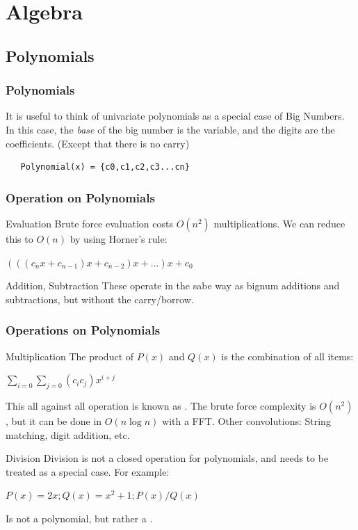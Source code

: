 \documentclass{beamer}
\begin{document}
\section{Algebra}
\subsection{Polynomials}

\begin{frame}
  \frametitle{Polynomials}

  \begin{block}{}
    It is useful to think of univariate polynomials as a special case
    of Big Numbers. In this case, the \emph{base} of the big number is
    the variable, and the digits are the coefficients. (Except that
    there is no carry)
  \end{block}
  \vspace{1cm}

\begin{verbatim}
   Polynomial(x) = {c0,c1,c2,c3...cn}
\end{verbatim}


\end{frame}

\begin{frame}
  \frametitle{Operation on Polynomials}
  \begin{block}{Evaluation}
    Brute force evaluation costs $O(n^2)$ multiplications. We can
    reduce this to $O(n)$ by using Horner's rule:\\
    \medskip

    $(((c_nx + c_{n-1})x + c_{n-2})x + ...)x + c_0$
  \end{block}

  \begin{block}{Addition, Subtraction}
    These operate in the sabe way as bignum additions and
    subtractions, but without the carry/borrow.
  \end{block}
\end{frame}

\begin{frame}
  \frametitle{Operations on Polynomials}
  \begin{block}{Multiplication}
    The product of $P(x)$ and $Q(x)$ is the combination of all items:
    \begin{center}
    $\sum_{i=0}\sum_{j=0} (c_ic_j)x^{i+j}$
    \end{center}
    This all against all operation is known as
    . The brute force complexity is $O(n^2)$,
    but it can be done in $O(n\log n)$ with a FFT. Other convolutions:
    String matching, digit addition, etc.
  \end{block}
  \begin{block}{Division}
    Division is not a closed operation for polynomials, and needs to
    be treated as a special case. For example:
    \begin{center}
      $P(x) = 2x; Q(x) = x^2+1; P(x)/Q(x)$
    \end{center}
    Is not a polynomial, but rather a .
  \end{block}
\end{frame}
\end{document}
